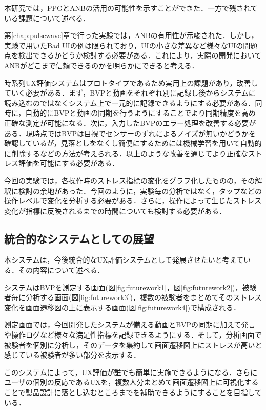 本研究では，PPGとANBの活用の可能性を示すことができた．一方で残されている課題について述べる．

第\ref{chap:pulsewave}章で行った実験では，ANBの有用性が示唆された．しかし，実験で用いたBad UIの例は限られており，UIの小さな差異など様々なUIの問題点を検出できるかどうか検討する必要がある．これにより，実際の開発においてANBがどこまで信頼できるのかを明らかにできると考える．

時系列UX評価システムはプロトタイプであるため実用上の課題があり，改善していく必要がある．まず，BVPと動画をそれぞれ別に記録し後からシステムに読み込むのではなくシステム上で一元的に記録できるようにする必要がある．同時に，自動的にBVPと動画の同期を行うようにすることでより同期精度を高め正確な測定が可能になる．次に，入力したBVPのエラー処理を改善する必要がある．現時点ではBVPは目視でセンサーのずれによるノイズが無いかどうかを確認しているが，見落としをなくし簡便にするためには機械学習を用いて自動的に削除するなどの方法が考えられる．以上のような改善を通じてより正確なストレス評価を可能にする必要がある．

今回の実験では，各操作時のストレス指標の変化をグラフ化したものの，その解釈に検討の余地があった．今回のように，実験毎の分析ではなく，タップなどの操作レベルで変化を分析する必要がある．さらに，操作によって生じたストレス変化が指標に反映されるまでの時間についても検討する必要がある．

\subsection{統合的なシステムとしての展望}

本システムは，今後統合的なUX評価システムとして発展させたいと考えている．その内容について述べる．

システムはBVPを測定する画面(図\ref{fig:futurework1}，図\ref{fig:futurework2})，被験者毎に分析する画面(図\ref{fig:futurework3})，複数の被験者をまとめてそのストレス変化を画面遷移図の上に表示する画面(図\ref{fig:futurework4})で構成される．

測定画面では，今回開発したシステムが備える動画とBVPの同期に加えて発言や操作ログなど様々な満足性指標を記録できるようにする．そして，分析画面で被験者を個別に分析し，そのデータを集約して画面遷移図上にストレスが高いと感じている被験者が多い部分を表示する．

このシステムによって，UX評価が誰でも簡単に実施できるようになる．さらにユーザの個別の反応であるUXを，複数人分まとめて画面遷移図上に可視化することで製品設計に落とし込むところまでを補助できるようにすることを目指している．

